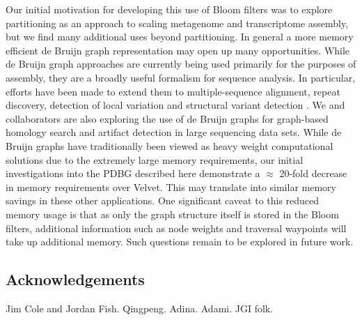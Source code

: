 \documentclass[12pt]{article} \usepackage{simplemargins}
\begin{document}
Our initial motivation for developing this use of Bloom filters was to explore
partitioning as an approach to scaling metagenome and transcriptome
assembly, but we find many additional uses beyond partitioning. In
general a more memory efficient de Bruijn graph representation may
open up many opportunities.  While de Bruijn graph approaches are currently being
used primarily for the purposes of assembly, they are a broadly useful
formalism for sequence analysis. In particular, efforts have been made
to extend them to multiple-sequence alignment\cite{zhang2003dna},
repeat discovery\cite{price2005novo}, detection of local variation and
structural variant detection \cite{zerbinothesis}.  We and collaborators are
also exploring the use of de Bruijn graphs for graph-based homology
search and artifact detection in large sequencing data sets.  While de
Bruijn graphs have traditionally been viewed as heavy weight
computational solutions due to the extremely large memory
requirements, our initial investigations into the PDBG described here
demonstrate a $\approx$ 20-fold decrease in memory requirements over
Velvet.  This may translate into similar memory savings in these
other applications.  One significant caveat to this reduced memory
usage is that as only the graph structure itself is stored in the
Bloom filters, additional information such as node weights and
traversal waypoints will take up additional memory.  Such questions
remain to be explored in future work.

\subsection{Acknowledgements}

Jim Cole and Jordan Fish.  Qingpeng.  Adina.  Adami.  JGI folk.



\end{document}
